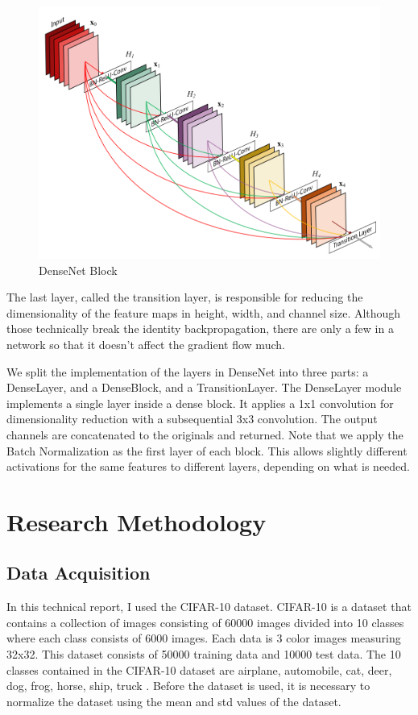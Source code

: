 \documentclass[peerreview]{IEEEtran}
\begin{document}
\begin{figure}[!ht]
    \centering
    \includegraphics[width=0.8\columnwidth]{densenet_block}
    \caption{DenseNet Block}
    \label{fig:densenet_block}
\end{figure}

The last layer, called the transition layer, is responsible for reducing the dimensionality of the feature maps in height, width, and channel size. Although those technically break the identity backpropagation, there are only a few in a network so that it doesn't affect the gradient flow much.

We split the implementation of the layers in DenseNet into three parts: a DenseLayer, and a DenseBlock, and a TransitionLayer. The DenseLayer module implements a single layer inside a dense block. It applies a 1x1 convolution for dimensionality reduction with a subsequential 3x3 convolution. The output channels are concatenated to the originals and returned. Note that we apply the Batch Normalization as the first layer of each block. This allows slightly different activations for the same features to different layers, depending on what is needed.

\section{Research Methodology}

\subsection{Data Acquisition}
In this technical report, I used the CIFAR-10 dataset. CIFAR-10 is a dataset that contains a collection of images consisting of 60000 images divided into 10 classes where each class consists of 6000 images. Each data is 3 color images measuring 32x32. This dataset consists of 50000 training data and 10000 test data. The 10 classes contained in the CIFAR-10 dataset are airplane, automobile, cat, deer, dog, frog, horse, ship, truck \cite{krizhevsky2009cifar}. Before the dataset is used, it is necessary to normalize the dataset using the mean and std values of the dataset.
\end{document}
